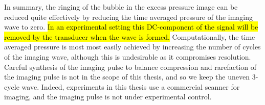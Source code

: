 In summary,
the ringing of the bubble in the excess pressure image can be reduced quite effectively 
by  reducing the time averaged pressure of the imaging wave to zero.
\hl{In an experimental setting this DC-component of the signal will be removed by the transducer when the wave is formed.}
Computationally, the time averaged pressure is most most easily achieved by increasing the number of cycles of the imaging wave,
although this is undesirable as it compromises resolution.
Careful synthesis of the imaging pulse to balance compression and rarefaction of the imaging pulse is not in the scope of this thesis,
and so we keep the uneven 3-cycle wave.
Indeed,  experiments in this thesis use a commercial scanner for imaging,
and the imaging pulse is not under experimental control.













